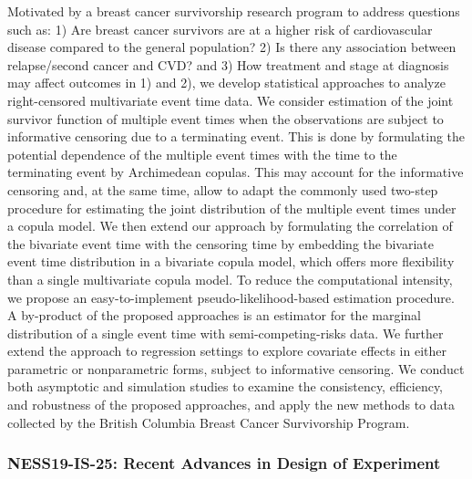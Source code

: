 \begin{itemize}
Motivated by a breast cancer survivorship research program to address questions such as: 1) Are breast cancer survivors are at a higher risk of cardiovascular disease compared to the general population? 2) Is there any association between relapse/second cancer and CVD? and 3) How treatment and stage at diagnosis may affect outcomes in 1) and 2), we develop statistical approaches to analyze right-censored multivariate event time data. We consider estimation of the joint survivor function of multiple event times when the observations are subject to informative censoring due to a terminating event. This is done by formulating the potential dependence of the multiple event times with the time to the terminating event by Archimedean copulas. This may account for the informative censoring and, at the same time, allow to adapt the commonly used two-step procedure for estimating the joint distribution of the multiple event times under a copula model. We then extend our approach by formulating the correlation of the bivariate event time with the censoring time by embedding the bivariate event time distribution in a bivariate copula model, which offers more flexibility than a single multivariate copula model. To reduce the computational intensity, we propose an easy-to-implement pseudo-likelihood-based estimation procedure. A by-product of the proposed approaches is an estimator for the marginal distribution of a single event time with semi-competing-risks data. We further extend the approach to regression settings to explore covariate effects in either parametric or nonparametric forms, subject to informative censoring. We conduct both asymptotic and simulation studies to examine the consistency, efficiency, and robustness of the proposed approaches, and apply the new methods to data collected by the British Columbia Breast Cancer Survivorship Program.

\end{itemize}

\subsubsection*{NESS19-IS-25: Recent Advances in Design of Experiment}

